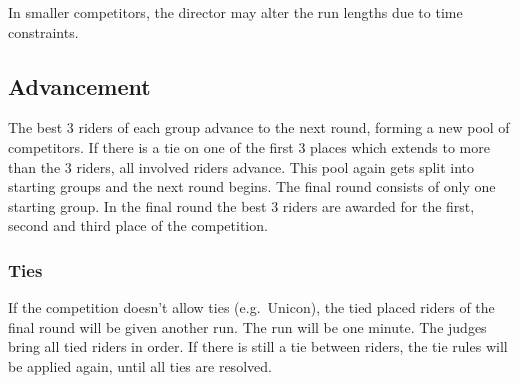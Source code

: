 In smaller competitors, the director may alter the run lengths due to time constraints.

\subsection{Advancement}
The best 3 riders of each group advance to the next round, forming a new pool of competitors.
If there is a tie on one of the first 3 places which extends to more than the 3 riders, all involved riders advance.
This pool again gets split into starting groups and the next round begins.
The final round consists of only one starting group.
In the final round the best 3 riders are awarded for the first, second and third place of the competition.

\subsubsection{Ties}
If the competition doesn't allow ties (e.g.\ Unicon), the tied placed riders of the final round will be given another run.
The run will be one minute.
The judges bring all tied riders in order.
If there is still a tie between riders, the tie rules will be applied again, until all ties are resolved.
